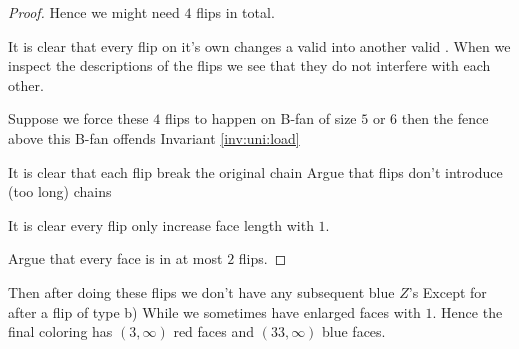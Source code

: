 \begin{proof}
  Hence we might need $4$ flips in total.

  It is clear that every flip on it's own changes a valid \rel into another valid \rel.
  When we inspect the descriptions of the flips we see that they do not interfere with each other.

  Suppose we force these $4$ flips to happen on B-fan of size $5$ or $6$ then the fence above this B-fan offends Invariant \ref{inv:uni:load}


  It is clear that each flip break the original chain
  Argue that flips don't introduce (too long) chains

  It is clear every flip only increase face length with $1$.

  Argue that every face is in at most $2$ flips.



\end{proof}


Then after doing these flips we don't have any subsequent blue $Z$'s Except for after a flip of type b) While we sometimes have enlarged faces with $1$.  Hence the final coloring has $(3, \infty)$ red faces and $(33, \infty)$ blue faces.
